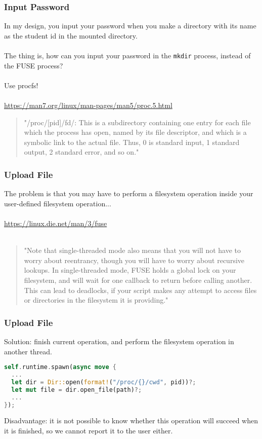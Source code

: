 \documentclass[usenames,xcolor=svgnames,11pt,sans]{beamer}
\begin{document}
\begin{frame}[fragile]
\frametitle{Input Password}
In my design, you input your password when you make a directory with its name as the student id in the mounted directory.
\pause ~\\~\\
The thing is, how can you input your password in the \lstinline|mkdir| process, instead of the FUSE process?
\pause ~\\~\\
Use procfs!
~\\~\\
\href{https://man7.org/linux/man-pages/man5/proc.5.html}{https://man7.org/linux/man-pages/man5/proc.5.html}

\begin{quote}
"/proc/[pid]/fd/: This is a subdirectory containing one entry for each file which the process has open, named by its file descriptor, and which is a symbolic link to the actual file. Thus, 0 is standard input, 1 standard output, 2 standard error, and so on."
\end{quote}
\end{frame}

\begin{frame}[fragile]
\frametitle{Upload File}
The problem is that you may have to perform a filesystem operation inside your user-defined filesystem operation...
\pause ~\\~\\
\href{https://linux.die.net/man/3/fuse}{https://linux.die.net/man/3/fuse}
~\\~\\
\begin{quote}
"Note that single-threaded mode also means that you will not have to worry about reentrancy, though you will have to worry about recursive lookups. In single-threaded mode, FUSE holds a global lock on your filesystem, and will wait for one callback to return before calling another. This can lead to deadlocks, if your script makes any attempt to access files or directories in the filesystem it is providing."
\end{quote}
\end{frame}

\begin{frame}[fragile]
\frametitle{Upload File}
Solution: finish current operation, and perform the filesystem operation in another thread.

\begin{lstlisting}[language=Rust]
self.runtime.spawn(async move {
  ...
  let dir = Dir::open(format!("/proc/{}/cwd", pid))?;
  let mut file = dir.open_file(path)?;
  ...
});
\end{lstlisting}

\pause

Disadvantage: it is not possible to know whether this operation will succeed when it is finished, so we cannot report it to the user either.
\end{frame}
\end{document}
